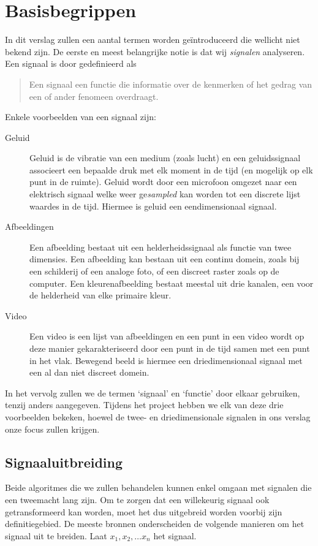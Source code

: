 \chapter{Basisbegrippen}
In dit verslag zullen een aantal termen worden ge\"introduceerd die wellicht niet bekend zijn. De eerste en meest belangrijke notie is dat wij \emph{signalen} analyseren. Een signaal is door \cite{signal} gedefinieerd als
\begin{quote}
Een signaal een functie die informatie over de kenmerken of het gedrag van een of ander fenomeen overdraagt.
\end{quote}

Enkele voorbeelden van een signaal zijn:
\begin{description}
	\item[Geluid] Geluid is de vibratie van een medium (zoals lucht) en een geluidssignaal associeert een bepaalde druk met elk moment in de tijd (en mogelijk op elk punt in de ruimte). Geluid wordt door een microfoon omgezet naar een elektrisch signaal welke weer ge\emph{sampled} kan worden tot een discrete lijst waardes in de tijd. Hiermee is geluid een eendimensionaal signaal.
	\item[Afbeeldingen] Een afbeelding bestaat uit een helderheidssignaal als functie van twee dimensies. Een afbeelding kan bestaan uit een continu domein, zoals bij een schilderij of een analoge foto, of een discreet raster zoals op de computer. Een kleurenafbeelding bestaat meestal uit drie kanalen, een voor de helderheid van elke primaire kleur.
	\item[Video] Een video is een lijst van afbeeldingen en een punt in een video wordt op deze manier gekarakteriseerd door een punt in de tijd samen met een punt in het vlak. Bewegend beeld is hiermee een driedimensionaal signaal met een al dan niet discreet domein.
\end{description}

In het vervolg zullen we de termen `signaal' en `functie' door elkaar gebruiken, tenzij anders aangegeven. Tijdens het project hebben we elk van deze drie voorbeelden bekeken, hoewel de twee- en driedimensionale signalen in ons verslag onze focus zullen krijgen.

\section{Signaaluitbreiding}
\label{signaal}
Beide algoritmes die we zullen behandelen kunnen enkel omgaan met signalen die een tweemacht lang zijn. Om te zorgen dat een willekeurig signaal ook getransformeerd kan worden, moet het dus uitgebreid worden voorbij zijn definitiegebied. De meeste bronnen onderscheiden de volgende manieren om het signaal uit te breiden.\cite{mallat,pywt} Laat $x_1, x_2, \ldots x_n$ het signaal.

